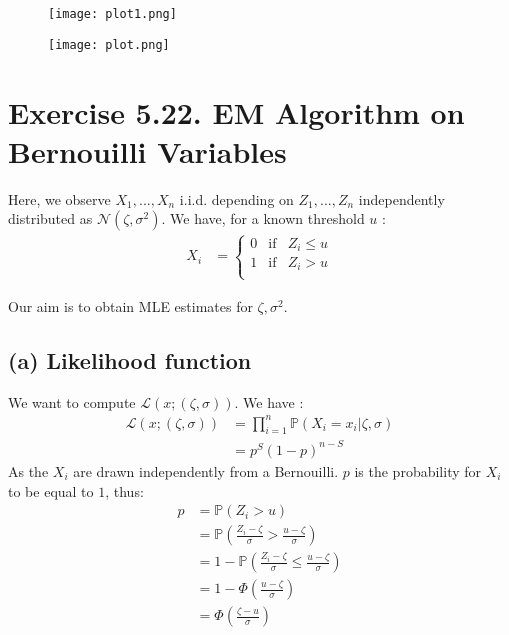 \documentclass{article}
\begin{document}
    \begin{figure}
        \begin{center}
            \label{fig:sa1}
            \texttt{[image: plot1.png]} 
        \end{center}
    \end{figure}

    \begin{figure}
        \begin{center}
            \label{fig:sa2}
            \texttt{[image: plot.png]}
        \end{center}
    \end{figure}

\newpage
\section*{Exercise 5.22. EM Algorithm on Bernouilli Variables}

Here, we observe $X_1, ..., X_n$ i.i.d. depending on $Z_1, ..., Z_n$ 
independently distributed as $\mathcal{N}(\zeta, \sigma^2)$. 
We have, for a known threshold $u$ : 
\begin{align*}
    X_i &= \left \{ \begin{array}{ccc}
        0 & \text{if} & Z_i \leq u \\
        1 & \text{if} & Z_i > u \\
    \end{array} \right .
\end{align*}

Our aim is to obtain MLE estimates for $\zeta, \sigma^2$.
\subsection*{(a) Likelihood function}

We want to compute $\mathcal{L}(x; (\zeta, \sigma))$. We have :
\begin{align*}
    \mathcal{L}(x; (\zeta, \sigma)) &= 
                \prod_{i=1}^{n} \mathbb{P}(X_i = x_i | \zeta, \sigma) \\
            &=p^S (1-p)^{n-S}
\end{align*}
As the $X_i$ are drawn independently from a Bernouilli.
 $p$ is the probability for $X_i$ to be equal to $1$, thus:
 \begin{align*}
    p &= \mathbb{P}(Z_i > u) \\
    &= \mathbb{P}\left (\frac{Z_i-\zeta}{\sigma} > \frac{u-\zeta}{\sigma} \right ) \\
    &= 1- \mathbb{P}\left (\frac{Z_i-\zeta}{\sigma} \leq \frac{u-\zeta}{\sigma} \right ) \\
    &= 1-\Phi \left ( \frac{u-\zeta}{\sigma}  \right)\\
    &= \Phi \left( \frac{\zeta - u}{\sigma}  \right)
 \end{align*}
\end{document}
